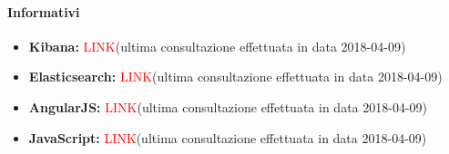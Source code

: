 		\paragraph{Informativi} 
			\begin{itemize}
				\item \textbf{Kibana:} \textcolor{red}{LINK}(ultima consultazione effettuata in data 2018-04-09)
				\item \textbf{Elasticsearch:} \textcolor{red}{LINK}(ultima consultazione effettuata in data 2018-04-09)
				\item \textbf{AngularJS:} \textcolor{red}{LINK}(ultima consultazione effettuata in data 2018-04-09)
				\item \textbf{JavaScript:} \textcolor{red}{LINK}(ultima consultazione effettuata in data 2018-04-09)
			\end{itemize}
